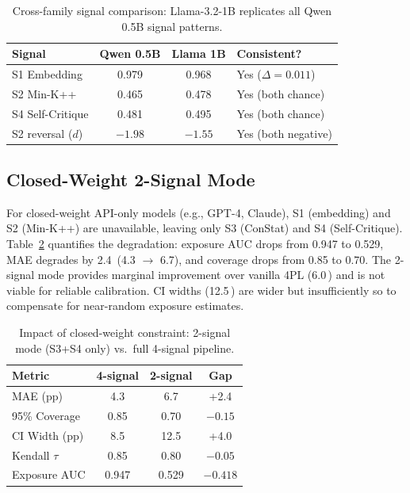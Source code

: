 \documentclass[11pt,a4paper]{article}
\newcommand{\pp}{\,\text{pp}}
\begin{document}
\begin{table}[t]
\centering
\caption{Cross-family signal comparison: Llama-3.2-1B replicates all Qwen 0.5B signal patterns.}
\label{tab:cross_family_signal}
\small
\begin{tabular}{lccl}
\toprule
\textbf{Signal} & \textbf{Qwen 0.5B} & \textbf{Llama 1B} & \textbf{Consistent?} \\
\midrule
S1 Embedding    & 0.979 & 0.968 & Yes ($\Delta=0.011$) \\
S2 Min-K++      & 0.465 & 0.478 & Yes (both chance) \\
S4 Self-Critique & 0.481 & 0.495 & Yes (both chance) \\
S2 reversal ($d$) & $-1.98$ & $-1.55$ & Yes (both negative) \\
\bottomrule
\end{tabular}
\end{table}

\subsection{Closed-Weight 2-Signal Mode}
\label{sec:closed_weight}

For closed-weight API-only models (e.g., GPT-4, Claude), S1 (embedding) and S2 (Min-K++) are unavailable, leaving only S3 (ConStat) and S4 (Self-Critique). Table~\ref{tab:2signal} quantifies the degradation: exposure AUC drops from 0.947 to 0.529, MAE degrades by 2.4\pp{} (4.3 $\to$ 6.7), and coverage drops from 0.85 to 0.70. The 2-signal mode provides marginal improvement over vanilla 4PL (6.0\pp{}) and is not viable for reliable calibration. CI widths (12.5\pp{}) are wider but insufficiently so to compensate for near-random exposure estimates.

\begin{table}[t]
\centering
\caption{Impact of closed-weight constraint: 2-signal mode (S3+S4 only) vs.\ full 4-signal pipeline.}
\label{tab:2signal}
\small
\begin{tabular}{lccc}
\toprule
\textbf{Metric} & \textbf{4-signal} & \textbf{2-signal} & \textbf{Gap} \\
\midrule
MAE (pp)        & 4.3  & 6.7  & +2.4 \\
95\% Coverage   & 0.85 & 0.70 & $-0.15$ \\
CI Width (pp)   & 8.5  & 12.5 & +4.0 \\
Kendall $\tau$  & 0.85 & 0.80 & $-0.05$ \\
Exposure AUC    & 0.947 & 0.529 & $-0.418$ \\
\bottomrule
\end{tabular}
\end{table}
\end{document}
